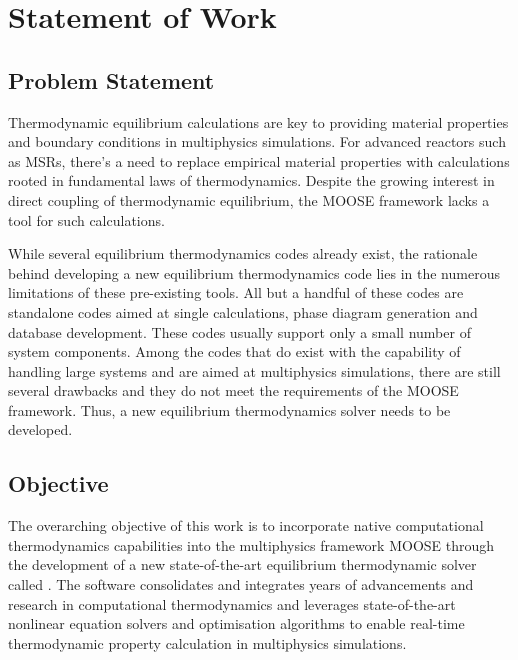 \chapter{Statement of Work} \label{chap:overview}
	
\section{Problem Statement}
    Thermodynamic equilibrium calculations are key to providing material properties and boundary conditions in multiphysics simulations. For advanced reactors such as MSRs, there's a need to replace empirical material properties with calculations rooted in fundamental laws of thermodynamics.  Despite the growing interest in direct coupling of thermodynamic equilibrium, the MOOSE framework lacks a tool for such calculations.

    While several equilibrium thermodynamics codes already exist, the rationale behind developing a new equilibrium thermodynamics code lies in the numerous limitations of these pre-existing tools. All but a handful of these codes are standalone codes aimed at single calculations, phase diagram generation and database development. These codes usually support only a small number of system components. Among the codes that do exist with the capability of handling large systems and are aimed at multiphysics simulations, there are still several drawbacks and they do not meet the requirements of the MOOSE framework. Thus, a new equilibrium thermodynamics solver needs to be developed.

\section{Objective}
    The overarching objective of this work is to incorporate native computational thermodynamics capabilities into the multiphysics framework MOOSE through the development of a new state-of-the-art equilibrium thermodynamic solver called \GEM. The software consolidates and integrates years of advancements and research in computational thermodynamics and leverages state-of-the-art nonlinear equation solvers and optimisation algorithms to enable real-time thermodynamic property calculation in multiphysics simulations. 

